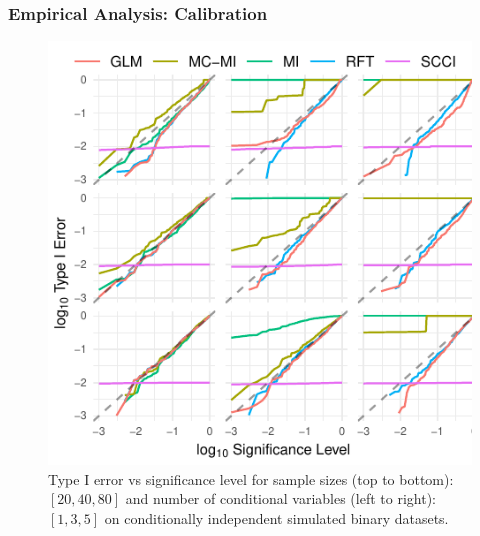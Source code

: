 \documentclass{beamer}
\begin{document}
\begin{frame}
	\frametitle{Empirical Analysis: Calibration}
	\begin{figure}
		\centering
		\includegraphics[scale=0.8]{imgs/calibration_add_vars.pdf}
		\caption*{Type I error vs significance level for sample sizes (top to
		bottom): $ [20, 40, 80] $ and number of conditional variables (left to
		right): $ [1, 3, 5] $ on conditionally independent simulated binary
		datasets.}
	\end{figure}
\end{frame}
\end{document}
